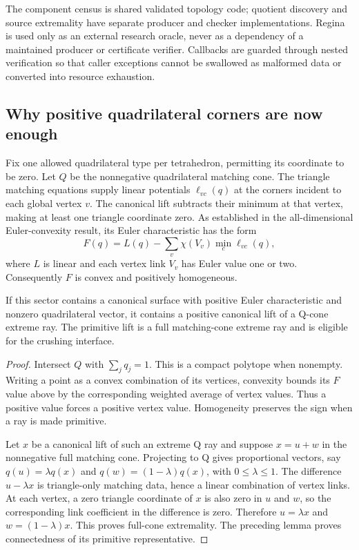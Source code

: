 The component census is shared validated topology code; quotient discovery
and source extremality have separate producer and checker implementations.
Regina is used only as an external research oracle, never as a dependency
of a maintained producer or certificate verifier.  Callbacks are guarded
through nested verification so that caller exceptions cannot be swallowed
as malformed data or converted into resource exhaustion.

\subsection{Why positive quadrilateral corners are now enough}

Fix one allowed quadrilateral type per tetrahedron, permitting its coordinate
to be zero.  Let $Q$ be the nonnegative quadrilateral matching cone.  The
triangle matching equations supply linear potentials $\ell_{vc}(q)$ at
the corners incident to each global vertex $v$.  The canonical lift subtracts
their minimum at that vertex, making at least one triangle coordinate zero.
As established in the all-dimensional Euler-convexity result, its Euler
characteristic has the form
\[
 F(q)=L(q)-\sum_v\chi(V_v)\min_c\ell_{vc}(q),
\]
where $L$ is linear and each vertex link $V_v$ has Euler value one or two.
Consequently $F$ is convex and positively homogeneous.

\begin{proposition}
If this sector contains a canonical surface with positive Euler
characteristic and nonzero quadrilateral vector, it contains a positive
canonical lift of a Q-cone extreme ray.  The primitive lift is a full
matching-cone extreme ray and is eligible for the crushing interface.
\end{proposition}
\begin{proof}
Intersect $Q$ with $\sum_jq_j=1$.  This is a compact polytope when nonempty.
Writing a point as a convex combination of its vertices, convexity bounds
its $F$ value above by the corresponding weighted average of vertex values.
Thus a positive value forces a positive vertex value.  Homogeneity preserves
the sign when a ray is made primitive.

Let $x$ be a canonical lift of such an extreme Q ray and suppose $x=u+w$
in the nonnegative full matching cone.  Projecting to Q gives proportional
vectors, say $q(u)=\lambda q(x)$ and $q(w)=(1-\lambda)q(x)$, with
$0\leq\lambda\leq1$.  The difference $u-\lambda x$ is triangle-only
matching data, hence a linear combination of vertex links.  At each vertex,
a zero triangle coordinate of $x$ is also zero in $u$ and $w$, so the
corresponding link coefficient in the difference is zero.  Therefore
$u=\lambda x$ and $w=(1-\lambda)x$.  This proves full-cone extremality.
The preceding lemma proves connectedness of its primitive representative.
\end{proof}

